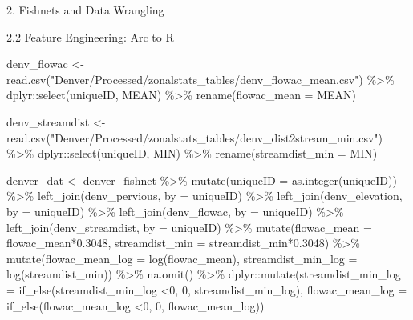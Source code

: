 \documentclass[
  ignorenonframetext,
]{beamer}
\newenvironment{Shaded}{\begin{snugshade}}{\end{snugshade}}
\newcommand{\AttributeTok}[1]{\textcolor[rgb]{0.77,0.63,0.00}{#1}}
\newcommand{\DecValTok}[1]{\textcolor[rgb]{0.00,0.00,0.81}{#1}}
\newcommand{\FloatTok}[1]{\textcolor[rgb]{0.00,0.00,0.81}{#1}}
\newcommand{\FunctionTok}[1]{\textcolor[rgb]{0.00,0.00,0.00}{#1}}
\newcommand{\NormalTok}[1]{#1}
\newcommand{\OtherTok}[1]{\textcolor[rgb]{0.56,0.35,0.01}{#1}}
\newcommand{\SpecialCharTok}[1]{\textcolor[rgb]{0.00,0.00,0.00}{#1}}
\newcommand{\StringTok}[1]{\textcolor[rgb]{0.31,0.60,0.02}{#1}}
\begin{document}
\begin{frame}[fragile]{2. Fishnets and Data Wrangling}
\begin{block}{2.2 Feature Engineering: Arc to R}
\begin{Shaded}
\begin{Highlighting}[]
\NormalTok{denv\_flowac }\OtherTok{\textless{}{-}} \FunctionTok{read.csv}\NormalTok{(}\StringTok{"Denver/Processed/zonalstats\_tables/denv\_flowac\_mean.csv"}\NormalTok{) }\SpecialCharTok{\%\textgreater{}\%} 
\NormalTok{    dplyr}\SpecialCharTok{::}\FunctionTok{select}\NormalTok{(uniqueID, MEAN) }\SpecialCharTok{\%\textgreater{}\%} 
  \FunctionTok{rename}\NormalTok{(}\AttributeTok{flowac\_mean =}\NormalTok{ MEAN)}


\NormalTok{denv\_streamdist }\OtherTok{\textless{}{-}} \FunctionTok{read.csv}\NormalTok{(}\StringTok{"Denver/Processed/zonalstats\_tables/denv\_dist2stream\_min.csv"}\NormalTok{) }\SpecialCharTok{\%\textgreater{}\%} 
\NormalTok{    dplyr}\SpecialCharTok{::}\FunctionTok{select}\NormalTok{(uniqueID, MIN) }\SpecialCharTok{\%\textgreater{}\%} 
  \FunctionTok{rename}\NormalTok{(}\AttributeTok{streamdist\_min =}\NormalTok{ MIN)}


\NormalTok{denver\_dat }\OtherTok{\textless{}{-}}\NormalTok{ denver\_fishnet }\SpecialCharTok{\%\textgreater{}\%}
  \FunctionTok{mutate}\NormalTok{(}\AttributeTok{uniqueID =} \FunctionTok{as.integer}\NormalTok{(uniqueID)) }\SpecialCharTok{\%\textgreater{}\%} 
  \FunctionTok{left\_join}\NormalTok{(denv\_pervious, }\AttributeTok{by =} \StringTok{\textquotesingle{}uniqueID\textquotesingle{}}\NormalTok{) }\SpecialCharTok{\%\textgreater{}\%}
  \FunctionTok{left\_join}\NormalTok{(denv\_elevation, }\AttributeTok{by =} \StringTok{\textquotesingle{}uniqueID\textquotesingle{}}\NormalTok{) }\SpecialCharTok{\%\textgreater{}\%} 
  \FunctionTok{left\_join}\NormalTok{(denv\_flowac, }\AttributeTok{by =} \StringTok{\textquotesingle{}uniqueID\textquotesingle{}}\NormalTok{) }\SpecialCharTok{\%\textgreater{}\%} 
  \FunctionTok{left\_join}\NormalTok{(denv\_streamdist, }\AttributeTok{by =} \StringTok{\textquotesingle{}uniqueID\textquotesingle{}}\NormalTok{) }\SpecialCharTok{\%\textgreater{}\%}
  \FunctionTok{mutate}\NormalTok{(}\AttributeTok{flowac\_mean =}\NormalTok{ flowac\_mean}\SpecialCharTok{*}\FloatTok{0.3048}\NormalTok{,}
         \AttributeTok{streamdist\_min =}\NormalTok{ streamdist\_min}\SpecialCharTok{*}\FloatTok{0.3048}\NormalTok{) }\SpecialCharTok{\%\textgreater{}\%} 
    \FunctionTok{mutate}\NormalTok{(}\AttributeTok{flowac\_mean\_log =} \FunctionTok{log}\NormalTok{(flowac\_mean),}
         \AttributeTok{streamdist\_min\_log =} \FunctionTok{log}\NormalTok{(streamdist\_min)) }\SpecialCharTok{\%\textgreater{}\%} 
  \FunctionTok{na.omit}\NormalTok{() }\SpecialCharTok{\%\textgreater{}\%} 
\NormalTok{    dplyr}\SpecialCharTok{::}\FunctionTok{mutate}\NormalTok{(}\AttributeTok{streamdist\_min\_log =} \FunctionTok{if\_else}\NormalTok{(streamdist\_min\_log }\SpecialCharTok{\textless{}}\DecValTok{0}\NormalTok{, }\DecValTok{0}\NormalTok{, streamdist\_min\_log),}
         \AttributeTok{flowac\_mean\_log =} \FunctionTok{if\_else}\NormalTok{(flowac\_mean\_log }\SpecialCharTok{\textless{}}\DecValTok{0}\NormalTok{, }\DecValTok{0}\NormalTok{, flowac\_mean\_log))}
\end{Highlighting}
\end{Shaded}


\end{block}
\end{frame}
\end{document}
